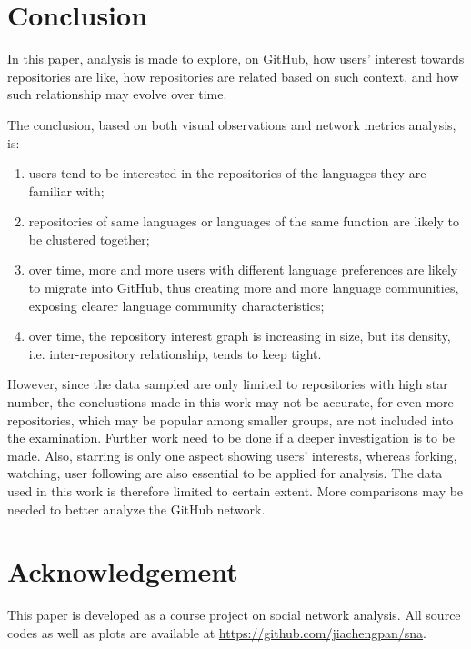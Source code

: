 \documentclass[11pt]{article}
\begin{document}
\section{Conclusion}

In this paper, analysis is made to explore, on GitHub, how users' interest towards repositories are like, how repositories are related based on such context, and how such relationship may evolve over time.

The conclusion, based on both visual observations and network metrics analysis, is:
\begin{enumerate}
\item users tend to be interested in the repositories of the languages they are familiar with;
\item repositories of same languages or languages of the same function are likely to be clustered together;
\item over time, more and more users with different language preferences are likely to migrate into GitHub, thus creating more and more language communities, exposing clearer language community characteristics;
\item over time, the repository interest graph is increasing in size, but its density, i.e. inter-repository relationship, tends to keep tight.
\end{enumerate}

However, since the data sampled are only limited to repositories with high star number, the conclustions made in this work may not be accurate, for even more repositories, which may be popular among smaller groups, are not included into the examination. Further work need to be done if a deeper investigation is to be made.
Also, starring is only one aspect showing users' interests, whereas forking, watching, user following are also essential to be applied for analysis. The data used in this work is therefore limited to certain extent. More comparisons may be needed to better analyze the GitHub network.

\section{Acknowledgement}

This paper is developed as a course project on social network analysis\cite{snacourse}.
All source codes as well as plots are available at \url{https://github.com/jiachengpan/sna}.

{\small


}
\end{document}
